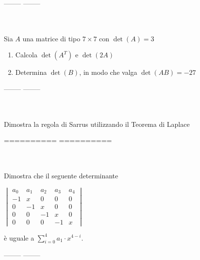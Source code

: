 \documentclass[a4paper,10pt]{article}
\begin{document}


--------
\bigskip
--------



 \\\\
    Sia $A$ una matrice di tipo $7 \times 7$ con $\det(A)=3$
    \begin{enumerate}
        \item Calcola $\det(A^{T})$ e $\det(2A)$
        \item Determina $\det(B)$, in modo che valga $\det(AB) = -27$
    \end{enumerate}



--------
\bigskip
--------



 \\\\
    Dimostra la regola di Sarrus utilizzando il Teorema di Laplace



==========
\pagebreak
==========


 \\\\
    Dimostra che il seguente determinante

    \begin{center}
        $ 
        \begin{vmatrix}
            a_{0} & a_{1} & a_{2} & a_{3} & a_{4} \\
            -1 & x & 0 & 0 & 0 \\
            0 & -1 & x & 0 & 0 \\
            0 & 0 & -1 & x & 0 \\
            0 & 0 & 0 & -1 & x 
        \end{vmatrix}
        $
    \end{center}
    è uguale a $\displaystyle\sum\limits_{i=0}^{4}{a_{1} \cdot x^{4-i}}$.




--------
\bigskip
--------


\end{document}
